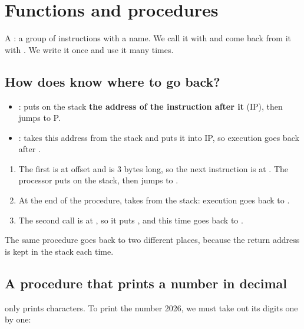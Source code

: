 \section{Functions and procedures}

\begin{tarif}
    A : a group of instructions with a name. We call it with
     and come back from it with . We write it once and use it many times.
\end{tarif}

\subsection{How does  know where to go back?}
\begin{itemize}
    \item {}: puts on the stack \textbf{the address of the instruction after it} (IP), then jumps to P.
    \item {}: takes this address from the stack and puts it into IP, so execution goes back after .
\end{itemize}

\begin{khatwa}
    \begin{enumerate}
        \item The first  is at offset  and is 3 bytes long, so the next instruction is
              at . The processor puts  on the stack, then jumps to .
        \item At the end of the procedure,  takes  from the stack: execution goes back to .
        \item The second call is at , so it puts , and this time  goes back to .
    \end{enumerate}
    The same procedure goes back to two different places, because the return address is kept in the stack each time.
\end{khatwa}

\subsection{A procedure that prints a number in decimal}
 only prints characters. To print the number 2026, we must take out its digits one by one:

